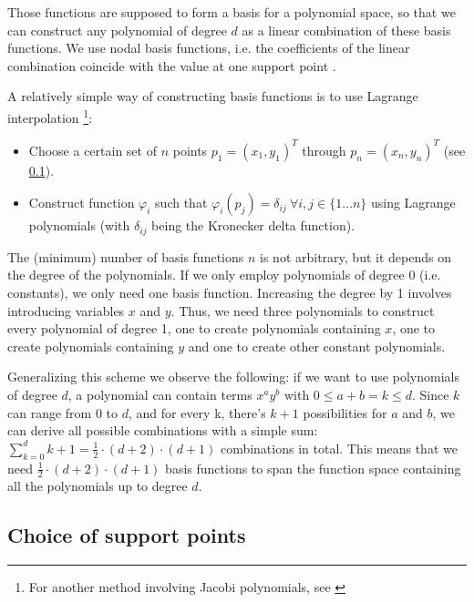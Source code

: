 \documentclass{article}
\renewcommand{\phi}{\varphi}
\begin{document}
Those functions are supposed to form a basis for a polynomial space, so that we can construct any polynomial of degree $d$ as a linear combination of these basis functions. We use nodal basis functions, i.e. the coefficients of the linear combination coincide with the value at one support point \cite{boeck08discontinuous-galerkin-verfahren}.

A relatively simple way of constructing basis functions is to use Lagrange interpolation
\footnote{For another method involving Jacobi polynomials, see \cite{castro07high-order-ader-fv-dg-numerical-methods, hesthaven2007nodal}}:

\begin{itemize}
\item Choose a certain set of $n$ points $p_1=\left( x_1,y_1 \right)^T$ through $p_n=\left( x_n,y_n \right)^T$ (see \ref{sec:choice-support-points}).
\item Construct function $\phi_i$ such that $\phi_i(p_j) = \delta_{ij} \  \forall i,j \in \{1 \dots n\}$ using Lagrange polynomials (with $\delta_{ij}$ being the Kronecker delta function).
\end{itemize}

The (minimum) number of basis functions $n$ is not arbitrary, but it depends on the degree of the polynomials. If we only employ polynomials of degree 0 (i.e.\,constants), we only need one basis function. Increasing the degree by 1 involves introducing variables $x$ and $y$. Thus, we need three polynomials to construct every polynomial of degree 1, one to create polynomials containing $x$, one to create polynomials containing $y$ and one to create other constant polynomials.

Generalizing this scheme we observe the following: if we want to use polynomials of degree $d$, a polynomial can contain terms $x^a y^b$ with $0 \leq a+b = k \leq d$.
Since $k$ can range from 0 to $d$, and for every k, there's $k+1$ possibilities for $a$ and $b$, we can derive all possible combinations with a simple sum: $\sum_{k = 0}^d k+1 = \frac{1}{2} \cdot (d+2) \cdot (d+1)$ combinations in total.
This means that we need $\frac{1}{2} \cdot (d+2) \cdot (d+1)$ basis functions to span the function space containing all the polynomials up to degree $d$.

\subsection{Choice of support points}
\label{sec:choice-support-points}
\end{document}
